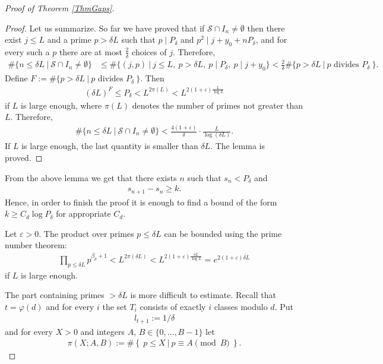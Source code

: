 \documentclass[a4paper]{amsart}
\newcommand{\1}{\mathbbm{1}}
\begin{document}
\begin{proof}[Proof of Theorem \ref{ThmGaps}]
\begin{proof}
Let us summarize. So far we have proved that if $\mathcal{S}\cap I_{n}\neq \emptyset$ then there exist $j\leq L$ and a prime $p>\delta L$ such that $p\mid P_{\delta}$ and $p^{2}\mid j+y_{0}+nP_{\delta}$, and for every such a $p$ there are at most $\frac{2}{\delta}$ choices of $j$. Therefore,
\begin{align*}
\#\{n\leq\delta L\ |\ \mathcal{S}\cap I_{n}\neq\emptyset\} &\leq \#\big\{ (j,p)\ \big|\ j\leq L,\ p>\delta L,\ p\mid P_{\delta},\ p\mid j+y_{0}\big\}<\frac{2}{\delta}\#\{ p>\delta L\ |\ p\textrm{ divides } P_{\delta}\ \}.
\end{align*}
Define $F:=\#\{ p>\delta L\ |\ p\textrm{ divides } P_{\delta}\ \}$. Then 
\begin{align*}
(\delta L)^{F}\leq P_{\delta}<L^{2\pi (L)}<L^{2(1+\varepsilon )\frac{L}{\log L}}
\end{align*}
if $L$ is large enough, where $\pi (L)$ denotes the number of primes not greater than $L$. Therefore,
\begin{align*}
\#\{n\leq \delta L\ |\ \mathcal{S}\cap I_{n}\neq\emptyset\}<\frac{4(1+\varepsilon )}{\delta}\cdot\frac{L}{\log (\delta L)}.
\end{align*}
If $L$ is large enough, the last quantity is smaller than $\delta L$. The lemma is proved.
\end{proof}

\vspace{\baselineskip}

From the above lemma we get that there exists $n$ such that $s_{n}<P_{\delta}$ and
\begin{align*}
s_{n+1}-s_{n}\geq k.
\end{align*}
Hence, in order to finish the proof it is enough to find a bound of the form $k\geq C_{d}\log P_{\delta}$ for appropriate $C_{d}$. 

Let $\varepsilon>0$. The product over primes $p\leq \delta L$ can be bounded using the prime number theorem:
\begin{align}\label{IneqProdpbeta+1}
\prod_{p\leq\delta L} p^{\beta_{p}+1}<L^{2\pi (\delta L)}<L^{2(1+\varepsilon )\frac{\delta L}{\log L}} = e^{2(1+\varepsilon )\delta L}
\end{align}
if $L$ is large enough. 

The part containing primes $>\delta L$ is more difficult to estimate. Recall that $t=\varphi (d)$ and for every $i$ the set $T_{i}$ consists of exactly $i$ classes modulo $d$. Put 
\begin{align}\label{Eqlt+1}
l_{t+1}:=1/\delta
\end{align}
and for every $X>0$ and integers $A$, $B\in\{0,\ldots ,B-1\}$ let
\begin{align*}
\pi (X;A,B) := \#\left\{\ p\leq X\ |\ p\equiv A \pmod{B}\ \right\}.
\end{align*}


\end{proof}
\end{document}
